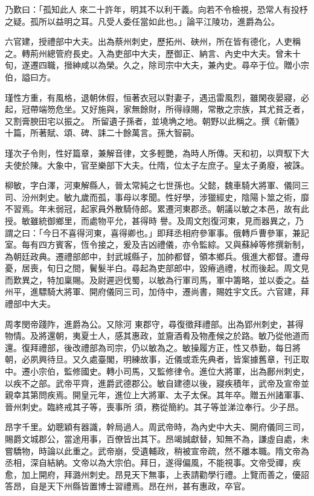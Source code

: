 \begin{pinyinscope}
 乃歎曰：「孤知此人
 來二十許年，明其不以利干義。向若不令檢視，恐常人有投杼之疑。孤所以益明之耳。凡受人委任當如此也。」論平江陵功，進爵為公。



 六官建，授禮部中大夫。出為蔡州刺史，歷拓州、硤州，所在皆有德化，人吏稱之。轉荊州總管府長史。入為吏部中大夫，歷御正、納言、內史中大夫。曾未十旬，遂遷四職，搢紳咸以為榮。久之，除司宗中大夫，兼內史。尋卒于位。贈小宗伯，謚曰方。



 瑾性方重，有風格，退朝休假，恒著衣冠以對妻子，遇迅雷風烈，雖閑夜晏寢，必起，冠帶端笏危坐。又好施與，家無餘財，所得祿賜，常散之宗族，其尤貧乏者，又割膏腴田宅以振之。
 所留遺子孫者，並墝埆之地。朝野以此稱之。撰《新儀》十篇，所著賦、頌、碑、誄二十餘萬言。孫大智嗣。



 瑾次子令則，性好篇章，兼解音律，文多輕艷，為時人所傳。天和初，以齊馭下大夫使於陳。大象中，官至樂部下大夫。仕隋，位太子左庶子。皇太子勇廢，被誅。



 柳敏，字白澤，河東解縣人，晉太常純之七世孫也。父懿，魏車騎大將軍、儀同三司、汾州刺史。敏九歲而孤，事母以孝聞。性好學，涉獵經史，陰陽卜筮之術，靡不習焉。年未弱冠，起家員外散騎侍郎。累遷河東郡丞。朝議以敏之本邑，故有此授。敏雖統御鄉里，而處物平允，甚得時
 譽。及周文剋復河東，見而器異之，乃謂之曰：「今日不喜得河東，喜得卿也。」即拜丞相府參軍事。俄轉戶曹參軍，兼記室。每有四方賓客，恆令接之，爰及吉凶禮儀，亦令監綜。又與蘇綽等修撰新制，為朝廷政典。遷禮部郎中，封武城縣子，加帥都督，領本鄉兵。俄進大都督。遭母憂，居喪，旬日之間，鬢髮半白。尋起為吏部郎中，毀瘠過禮，杖而後起。周文見而歎異之，特加稟賜。及尉遲迥伐蜀，以敏為行軍司馬，軍中籌略，並以委之。益州平，進驃騎大將軍、開府儀同三司，加侍中，遷尚書，賜姓宇文氏。六官建，拜禮部中大夫。



 周孝閔帝踐阼，進爵為公。又除河
 東郡守，尋復徵拜禮部。出為郢州刺史，甚得物情。及將還朝，夷夏士人，感其惠政，並齎酒肴及物產候之於路。敏乃從他道而還。復拜禮部，後改禮部為司宗，仍以敏為之。敏操履方正，性又恭勤，每日將朝，必夙興待旦。又久處臺閣，明練故事，近儀或乖先典者，皆案據舊章，刊正取中。遷小宗伯，監修國史。轉小司馬，又監修律令。進位大將軍，出為鄜州刺史，以疾不之部。武帝平齊，進爵武德郡公。敏自建德以後，寢疾積年，武帝及宣帝並親幸其第問疾焉。開皇元年，進位上大將軍、太子太保。其年卒。贈五州諸軍事、晉州刺史。臨終戒其子等，喪事所
 須，務從簡約。其子等並涕泣奉行。少子昂。



 昂字千里。幼聰穎有器識，幹局過人。周武帝時，為內史中大夫、開府儀同三司，賜爵文城郡公，當途用事，百僚皆出其下。昂竭誠獻替，知無不為，謙虛自處，未嘗驕物，時論以此重之。武帝崩，受遺輔政，稍被宣帝疏，然不離本職。隋文帝為丞相，深自結納。文帝以為大宗伯。拜日，遂得偏風，不能視事。文帝受禪，疾愈，加上開府，拜潞州刺史。昂見天下無事，上表請勸學行禮。上覽而善之，優詔答昂，自是天下州縣皆置博士習禮焉。昂在州，甚有惠政，卒官。




\end{pinyinscope}
